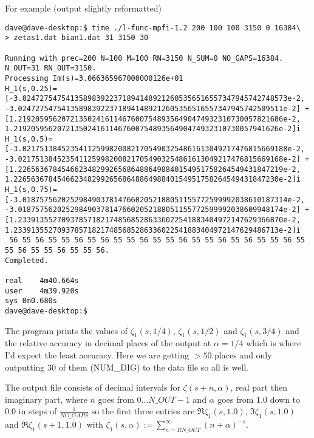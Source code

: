 \documentclass[12pt,a4paper]{article}
\begin{document}
For example (output slightly reformatted)
\begin{verbatim}
dave@dave-desktop:$ time ./l-func-mpfi-1.2 200 100 100 3150 0 16384\
> zetas1.dat bian1.dat 31 3150 30

Running with prec=200 N=100 M=100 RN=3150 N_SUM=0 NO_GAPS=16384.
N_OUT=31 RN_OUT=3150.
Processing Im(s)=3.066365967000000126e+01
H_1(s,0.25)=
[-3.0247275475413589839223718941489212605356516557347945742748573e-2,
-3.0247275475413589839223718941489212605356516557347945742509511e-2] +
[1.2192059562072135024161146760075489356490474932310730057821686e-2,
1.2192059562072135024161146760075489356490474932310730057941626e-2]i
H_1(s,0.5)=
[-3.0217513845235411259982008217054903254861613049217476815669188e-2,
-3.0217513845235411259982008217054903254861613049217476815669168e-2] +
[1.2265636784546623482992656864886498840154951758264549431847219e-2,
1.2265636784546623482992656864886498840154951758264549431847230e-2]i
H_1(s,0.75)=
[-3.0187575620252984903781476602052188051155772599992038610187314e-2,
-3.0187575620252984903781476602052188051155772599992038609948174e-2] +
[1.2339135527093785718217485685286336022541883404972147629366870e-2,
1.2339135527093785718217485685286336022541883404972147629486713e-2]i
 56 55 56 55 55 56 55 56 55 55 56 55 55 56 55 55 56 55 56 55 55 56 55 
55 56 55 55 56 55 55 56.
Completed.

real	4m40.664s
user	4m39.920s
sys	0m0.680s
dave@dave-desktop:$ 
\end{verbatim}
The program prints the values of $\zeta_1(s,1/4)$, $\zeta_1(s,1/2)$ and $\zeta_1(s,3/4)$ and the relative accuracy in decimal places of the output at $\alpha=1/4$ which is where I'd expect the least accuracy. Here we are getting $>50$ places and only outputting $30$ of them (NUM\_DIG) to the data file so all is well.

The output file consists of decimal intervals for $\zeta(s+n,\alpha)$, real part then imaginary part, where $n$ goes from $0\ldots N\_OUT-1$ and $\alpha$ goes from $1.0$ down to $0.0$ in steps of $\frac{1}{NO\_GAPS}$ so the first three entries are $\Re\zeta_1(s,1.0)$, $\Im\zeta_1(s,1.0)$ and $\Re\zeta_1(s+1,1.0)$ with $\zeta_1(s,\alpha):=\sum\limits_{n=RN\_OUT}^\infty(n+\alpha)^{-s}$.
\end{document}
